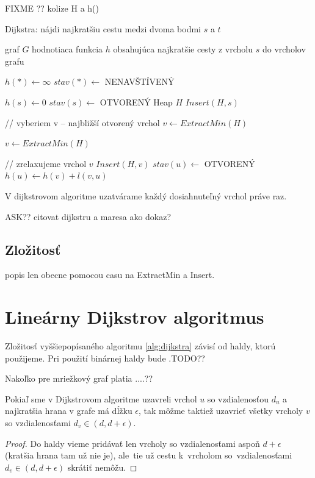 FIXME ?? kolize H a h()
\begin{algorithm}
\caption{Dijkstra: nájdi najkratšiu cestu medzi dvoma bodmi $s$ a $t$}
\label{alg:dijkstra}
\begin{algorithmic}[1] %
\REQUIRE graf $G$
\ENSURE hodnotiaca funkcia $h$ obsahujúca najkratšie cesty  z vrcholu $s$ do vrcholov grafu


\STATE $ h(*) \leftarrow \infty $
\STATE $ stav(*) \leftarrow$ NENAVŠTÍVENÝ

\STATE $h(s) \leftarrow 0$
\STATE $stav(s) \leftarrow $ OTVORENÝ
\STATE Heap $H$
\STATE $Insert(H, s)$

	
	\STATE // vyberiem v -- najbližší otvorený vrchol
	\STATE $v \leftarrow ExtractMin(H)$
	
		\STATE $v \leftarrow ExtractMin(H)$
	\ENDWHILE
	
	\STATE // zrelaxujeme vrchol $v$
			\STATE $Insert(H, v)$
			\STATE $stav(u) \leftarrow$ OTVORENÝ
			\STATE $h(u) \leftarrow h(v) + l(v, u)$
			
		\ENDIF
	\ENDFOR
\ENDWHILE

\end{algorithmic}
\end{algorithm}

\begin{theorem}
V dijkstrovom algoritme uzatvárame každý dosiahnuteľný vrchol práve raz.
\end{theorem}
ASK?? citovat dijkstru a maresa ako dokaz? 

\subsection{Zložitosť}
popis len obecne pomocou casu na ExtractMin a Insert.


\section{Lineárny Dijkstrov algoritmus}
Zložitosť vyššiepopísaného algoritmu \ref{alg:dijkstra}
závisí od haldy, ktorú použijeme. Pri použití binárnej haldy bude .TODO??

Nakoľko pre mriežkový graf platia ....??

\begin{theorem}
Pokiaľ sme v Dijkstrovom algoritme uzavreli vrchol $u$ so vzdialenosťou $d_u$ a najkratšia hrana v grafe má dĺžku $\epsilon$, tak môžme taktiež 
uzavrieť všetky vrcholy $v$ so vzdialenosťami $d_v \in (d, d + \epsilon)$.
\end{theorem}
\begin{proof}
Do haldy vieme pridávať len vrcholy so vzdialenosťami aspoň $d + \epsilon$ (kratšia hrana tam už nie je), 
ale~tie už cestu k~vrcholom so~vzdialenosťami
$d_v \in (d, d + \epsilon)$ skrátiť nemôžu.
\end{proof}



